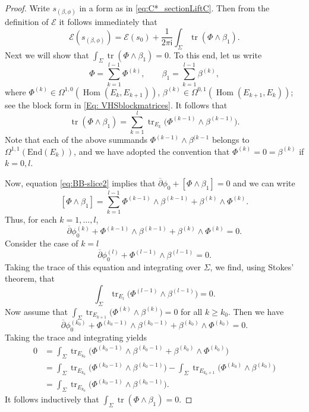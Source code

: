 \documentclass[10pt,a4paper]{amsart}
\renewcommand{\i}{\mathsf{i}}
\begin{document}
\begin{proof}
Write $s_{(\beta,\phi)}$ in a form as in \eqref{eq:C*_sectionLiftC}. Then from the definition of
$\mathcal{E}$ it follows immediately that
\[
\mathcal{E}(s_{(\beta,\phi)}) = \mathcal{E}(s_0)+\frac{1}{2\pi \i} \int_\Sigma \operatorname{tr}(\Phi \wedge \beta_1).
\]
Next we will show that $\int_\Sigma \operatorname{tr}(\Phi \wedge \beta_1) = 0$. To this end, let us write
\[
\Phi = \sum_{k=1}^{l-1}\Phi^{(k)},\qquad \beta_1 = \sum_{k=1}^{l-1}\beta^{(k)},
\]
where $\Phi^{(k)} \in \Omega^{1,0}(\operatorname{Hom}(E_k, E_{k+1}))$, $ \beta^{(k)} \in
\Omega^{0,1}(\operatorname{Hom}(E_{k+1}, E_k))$; see the block form in \eqref{Eq: VHSblockmatrices}. It follows that
\[
\operatorname{tr}(\Phi\wedge\beta_1) = \sum_{k=1}^l\operatorname{tr}_{E_k}\bigl(\Phi^{(k-1)}\wedge\beta^{(k-1)}\bigr).
\]
Note that each of the above summands $\Phi^{(k-1)}\wedge\beta^{(k-1}$ belongs to
$\Omega^{1,1}(\mathrm{End}(E_k))$, and we have adopted the convention that $\Phi^{(k)}
= 0 = \beta^{(k)}$ if $k = 0, l$.

Now, equation \eqref{eq:BB-slice2} implies that
$
{\overline{\partial}} \phi_0 + [\Phi\wedge\beta_{1}] = 0
$
and we can write
\[
[\Phi\wedge\beta_1] = \sum_{k=1}^{l-1}\Phi^{(k-1)}\wedge\beta^{(k-1)} + \beta^{(k)}\wedge\Phi^{(k)}.
\]
Thus, for each $k = 1, \dots, l$,
\[
{\overline{\partial}} \phi_0^{(k)} + \Phi^{(k-1)}\wedge\beta^{(k-1)} + \beta^{(k)}\wedge\Phi^{(k)} = 0.
\]
Consider the case of $k = l$
\[
{\overline{\partial}} \phi_0^{(l)} + \Phi^{(l-1)}\wedge\beta^{(l-1)} = 0.
\]
Taking the trace of this equation and integrating over $\Sigma$, we find, using Stokes' theorem,
that
\[
\int_\Sigma\operatorname{tr}_{E_l}\bigl(\Phi^{(l-1)}\wedge\beta^{(l-1)}\bigr) = 0.
\]
Now assume that $\int_\Sigma\operatorname{tr}_{E_{k+1}}\bigl(\Phi^{(k)}\wedge\beta^{(k)}\bigr) = 0$
for all $k \geq k_0$. Then we have
\[
{\overline{\partial}} \phi_0^{(k_0)} + \Phi^{(k_0-1)}\wedge\beta^{(k_0-1)} + \beta^{(k_0)}\wedge\Phi^{(k_0)} = 0.
\]
Taking the trace and integrating yields
\begin{align*}
0 &= \int_\Sigma\operatorname{tr}_{E_{k_0}}\bigl(\Phi^{(k_0-1)}\wedge\beta^{(k_0-1)} + \beta^{(k_0)}\wedge\Phi^{(k_0)}\bigr) \\
&= \int_\Sigma\operatorname{tr}_{E_{k_0}}\bigl(\Phi^{(k_0-1)}\wedge\beta^{(k_0-1)}\bigr) - \int_\Sigma\operatorname{tr}_{E_{k_0+1}}\bigl(\Phi^{(k_0)}\wedge\beta^{(k_0)}\bigr) \\
&= \int_\Sigma\operatorname{tr}_{E_{k_0}}\bigl(\Phi^{(k_0-1)}\wedge\beta^{(k_0-1)}\bigr).
\end{align*}
It follows inductively that $\int_\Sigma\operatorname{tr}(\Phi\wedge\beta_1) = 0$.


\end{proof}
\end{document}
